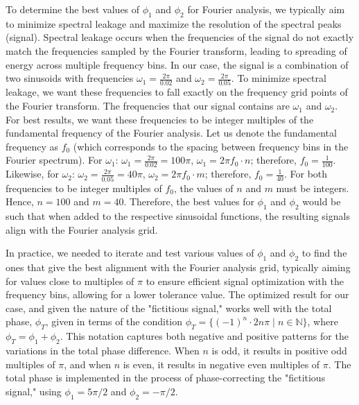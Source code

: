 \documentclass{article}
\begin{document}
To determine the best values of $\phi_1$ and $\phi_2$ for Fourier analysis, we typically aim to minimize spectral leakage and maximize the resolution of the spectral peaks (signal). Spectral leakage occurs when the frequencies of the signal do not exactly match the frequencies sampled by the Fourier transform, leading to spreading of energy across multiple frequency bins. In our case, the signal is a combination of two sinusoids with frequencies $\omega_1 = \frac{2\pi}{0.02}$ and $\omega_2 = \frac{2\pi}{0.05}$. To minimize spectral leakage, we want these frequencies to fall exactly on the frequency grid points of the Fourier transform. The frequencies that our signal contains are $\omega_1$ and $\omega_2$. For best results, we want these frequencies to be integer multiples of the fundamental frequency of the Fourier analysis. Let us denote the fundamental frequency as $f_0$ (which corresponds to the spacing between frequency bins in the Fourier spectrum). For $\omega_1$: $\omega_1 = \frac{2\pi}{0.02} = 100\pi$, $\omega_1 = 2\pi f_0 \cdot n$; therefore, $f_0 = \frac{1}{100}$. Likewise, for $\omega_2$: $\omega_2 = \frac{2\pi}{0.05} = 40\pi$, $\omega_2 = 2\pi f_0 \cdot m$; therefore, $f_0 = \frac{1}{40}$. For both frequencies to be integer multiples of $f_0$, the values of $n$ and $m$ must be integers. Hence, $n = 100$ and $m = 40$. Therefore, the best values for $\phi_1$ and $\phi_2$ would be such that when added to the respective sinusoidal functions, the resulting signals align with the Fourier analysis grid.

In practice, we needed to iterate and test various values of $\phi_1$ and $\phi_2$ to find the ones that give the best alignment with the Fourier analysis grid, typically aiming for values close to multiples of $\pi$ to ensure efficient signal optimization with the frequency bins, allowing for a lower tolerance value. The optimized result for our case, and given the nature of the "fictitious signal," works well with the total phase, $\phi_{T}$, given in terms of the condition $\phi_T = \{(-1)^n \cdot 2n\pi \mid n \in \mathbb{N}\}$, where $\phi_T = \phi_1 + \phi_2$. This notation captures both negative and positive patterns for the variations in the total phase difference. When $n$ is odd, it results in positive odd multiples of $\pi$, and when $n$ is even, it results in negative even multiples of $\pi$. The total phase is implemented in the process of phase-correcting the "fictitious signal," using $\phi_1 = 5\pi/2$ and $\phi_2 = -\pi/2$.

\end{document}
